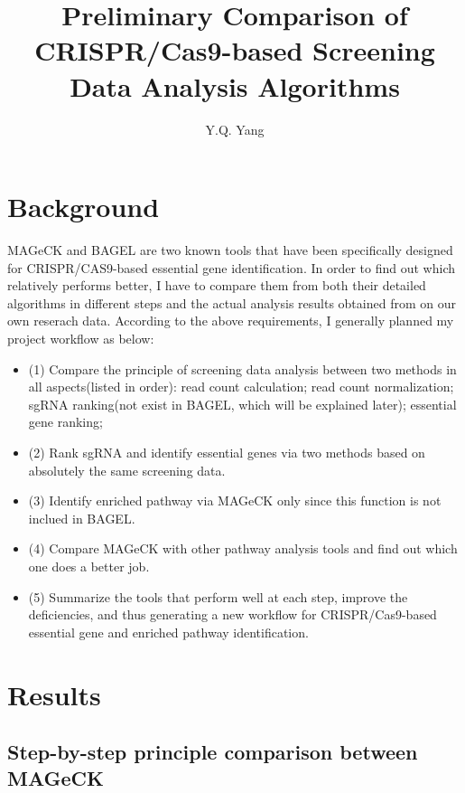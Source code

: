 \documentclass[fleqn,10pt]{wlscirep}
\title{Preliminary Comparison of CRISPR/Cas9-based Screening Data Analysis Algorithms}
\author[1,*]{Y.Q. Yang}
\begin{document}
\flushbottom
\maketitle

\thispagestyle{empty}

\section*{Background}

MAGeCK and BAGEL are two known tools that have been specifically designed for CRISPR/CAS9-based essential gene identification. In order to find out which relatively performs better, I have to compare them from both their detailed algorithms in different steps and the actual analysis results obtained from on our own reserach data.  According to the above requirements, I generally planned my project workflow as below:

\begin{itemize}
    \item (1) Compare the principle of screening data analysis between two methods in all aspects(listed in order):
        \subitem read count calculation;
        \subitem read count normalization;
        \subitem sgRNA ranking(not exist in BAGEL, which will be explained later);
        \subitem essential gene ranking;
    \item (2) Rank sgRNA and identify essential genes via two methods based on absolutely the same screening data.
    \item (3) Identify enriched pathway via MAGeCK only since this function is not inclued in BAGEL.
    \item (4) Compare MAGeCK with other pathway analysis tools and find out which one does a better job.
    \item (5) Summarize the tools that perform well at each step, improve the deficiencies, and thus generating a new workflow for CRISPR/Cas9-based essential gene and enriched pathway identification.
    \end{itemize}

\section*{Results}

\subsection*{Step-by-step principle comparison between MAGeCK}
\end{document}
